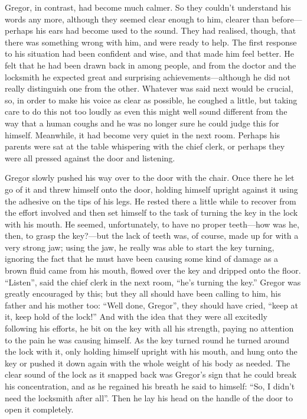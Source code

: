 Gregor, in contrast, had become much calmer. So they couldn’t
understand his words any more, although they seemed clear enough to
him, clearer than before—perhaps his ears had become used to the sound.
They had realised, though, that there was something wrong with him, and
were ready to help. The first response to his situation had been
confident and wise, and that made him feel better. He felt that he had
been drawn back in among people, and from the doctor and the locksmith
he expected great and surprising achievements—although he did not
really distinguish one from the other. Whatever was said next would be
crucial, so, in order to make his voice as clear as possible, he
coughed a little, but taking care to do this not too loudly as even
this might well sound different from the way that a human coughs and he
was no longer sure he could judge this for himself. Meanwhile, it had
become very quiet in the next room. Perhaps his parents were sat at the
table whispering with the chief clerk, or perhaps they were all pressed
against the door and listening.

Gregor slowly pushed his way over to the door with the chair. Once
there he let go of it and threw himself onto the door, holding himself
upright against it using the adhesive on the tips of his legs. He
rested there a little while to recover from the effort involved and
then set himself to the task of turning the key in the lock with his
mouth. He seemed, unfortunately, to have no proper teeth—how was he,
then, to grasp the key?—but the lack of teeth was, of course, made up
for with a very strong jaw; using the jaw, he really was able to start
the key turning, ignoring the fact that he must have been causing some
kind of damage as a brown fluid came from his mouth, flowed over the
key and dripped onto the floor. “Listen”, said the chief clerk in the
next room, “he’s turning the key.” Gregor was greatly encouraged by
this; but they all should have been calling to him, his father and his
mother too: “Well done, Gregor”, they should have cried, “keep at it,
keep hold of the lock!” And with the idea that they were all excitedly
following his efforts, he bit on the key with all his strength, paying
no attention to the pain he was causing himself. As the key turned
round he turned around the lock with it, only holding himself upright
with his mouth, and hung onto the key or pushed it down again with the
whole weight of his body as needed. The clear sound of the lock as it
snapped back was Gregor’s sign that he could break his concentration,
and as he regained his breath he said to himself: “So, I didn’t need
the locksmith after all”. Then he lay his head on the handle of the
door to open it completely.

